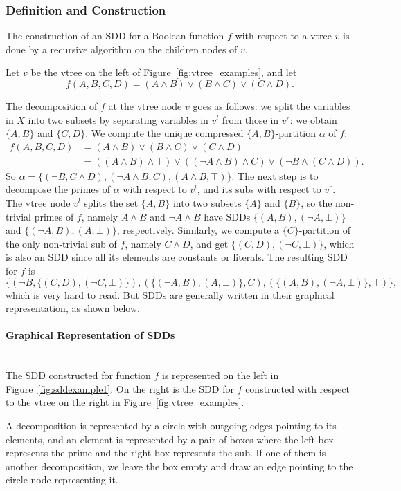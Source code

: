 \documentclass[11pt]{article}
\newcommand{\myparagraph}[1]{\paragraph{#1}\mbox{}\\}
\begin{document}
\subsubsection{Definition and Construction}

The construction of an SDD for a Boolean function $f$ with respect to a vtree $v$ is done by a recursive algorithm on the children nodes of $v$. 

Let $v$ be the vtree on the left of Figure~\ref{fig:vtree_examples}, and let $$f(A, B, C, D) = (A \land B) \lor (B \land C) \lor (C \land D).$$

The decomposition of $f$ at the vtree node $v$ goes as follows: we split the variables in $X$ into two subsets by separating variables in $v^l$ from those in $v^r$: we obtain $\{A, B\}$ and $\{C, D\}$. We compute the unique compressed $\{A, B\}$-partition $\alpha$ of $f$:
\begin{align*}
f(A, B, C, D) &= (A \land B) \lor (B \land C) \lor (C \land D)\\
&= ((A \land B) \land \top) \lor ((\lnot A \land B) \land C) \lor (\lnot B \land (C \land D)).
\end{align*}
So $\alpha = \{(\lnot B , C\land D), (\lnot A \land B, C), (A \land B, \top)\}$. The next step is to decompose the primes of $\alpha$ with respect to $v^l$, and its subs with respect to $v^r$. 
The vtree node $v^l$ splits the set $\{A, B\}$ into two subsets $\{A\}$ and $\{B\}$, so the non-trivial primes of $f$, namely $A \land B$ and $\lnot A \land B$ have SDDs $\{(A,B), (\lnot A, 
\bot)\}$ and $\{(\lnot A, B), (A, \bot)\}$, respectively. Similarly, we compute a $\{C\}$-partition of the only non-trivial sub of $f$, namely $C \land D$, and get $\{(C, D), (\lnot C, \bot)\}$, which is also an SDD since all its elements are constants or literals. 
The resulting SDD for $f$ is
$$\{(\lnot B , \{(C, D), (\lnot C, \bot)\}), (\{(\lnot A, B), (A, \bot)\}, C), (\{(A, B), (\lnot A, \bot)\}, \top)\},$$
which is very hard to read. But SDDs are generally written in their graphical representation, as shown below.

\myparagraph{Graphical Representation of SDDs}

The SDD constructed for function $f$ is represented on the left in Figure~\ref{fig:sddexample1}. On the right is the SDD for $f$ constructed with respect to the vtree on the right in Figure~\ref{fig:vtree_examples}.

A decomposition is represented by a circle with outgoing edges pointing to its elements, and an element is represented by a pair of boxes where the left box represents the prime and the right box represents the sub. If one of them is another decomposition, we leave the box empty and draw an edge pointing to the circle node representing it.
\end{document}
